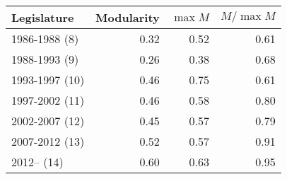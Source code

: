 \begin{tabular}{lrrr}
  \hline
Legislature & Modularity & $\max{M}$ & $M / \max{M}$ \\ 
  \hline
1986-1988 (8) & 0.32 & 0.52 & 0.61 \\ 
  1988-1993 (9) & 0.26 & 0.38 & 0.68 \\ 
  1993-1997 (10) & 0.46 & 0.75 & 0.61 \\ 
  1997-2002 (11) & 0.46 & 0.58 & 0.80 \\ 
  2002-2007 (12) & 0.45 & 0.57 & 0.79 \\ 
  2007-2012 (13) & 0.52 & 0.57 & 0.91 \\ 
  2012-- (14) & 0.60 & 0.63 & 0.95 \\ 
   \hline
\end{tabular}
